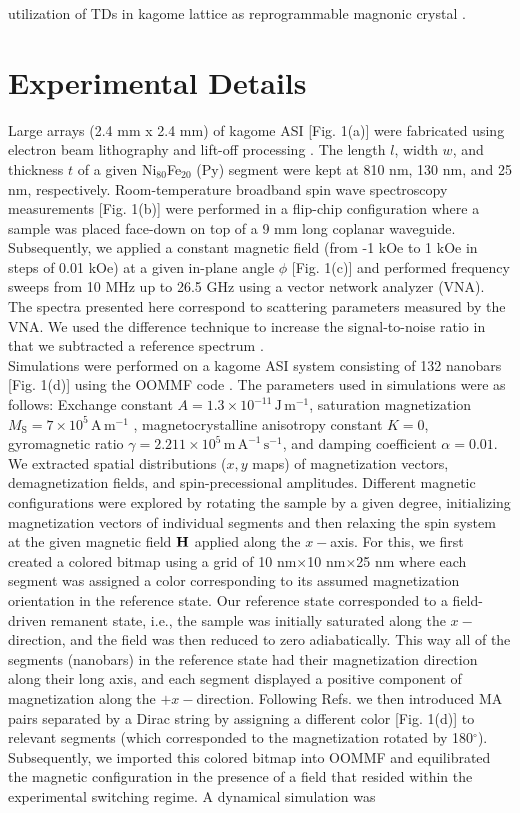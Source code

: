 \documentclass[aps,prl,preprint,showpacs,superscriptaddress,groupedaddress]{revtex4}%
\begin{document}
utilization of TDs in kagome lattice as reprogrammable magnonic crystal \cite{krawczyk2014review}.
\section{Experimental Details}
Large arrays (2.4 mm x 2.4 mm) of kagome ASI  [Fig. 1(a)] were fabricated using electron beam lithography and lift-off processing \cite{bhat2016magnetization}. The length $l$, width $w$, and thickness $t$ of a  given Ni$_{80}$Fe$_{20}$ (Py) segment  were kept at 810 nm, 130 nm, and 25 nm, respectively. Room-temperature broadband spin wave spectroscopy measurements  [Fig. 1(b)]  were performed in a flip-chip configuration where a sample was placed face-down on top of a 9 mm long coplanar waveguide. Subsequently, we applied a constant magnetic field (from -1 kOe  to 1  kOe in steps of 0.01 kOe) at a given in-plane angle $\phi$  [Fig. 1(c)]  and performed frequency sweeps from 10 MHz up to 26.5 GHz using a vector network analyzer (VNA). The  spectra presented here correspond to scattering parameters measured by the VNA. We used the difference technique to increase the signal-to-noise ratio in that we subtracted a reference spectrum \cite{bhat2016magnetization}.\\ Simulations were performed on a kagome ASI system consisting of 132 nanobars  [Fig. 1(d)] using the OOMMF code \cite{OOMMF1}. The parameters used in simulations were as follows: Exchange constant $A = 1.3 \times 10^{-11} \,\mathrm{J\,m^{-1}}$, saturation magnetization $M_{\mathrm{S}}= 7\times 10^{5} \,\mathrm{A\,m^{-1}}$ \cite{wang2007geometrical}, magnetocrystalline anisotropy constant $K = 0$, gyromagnetic ratio $\gamma = 2.211 \times 10^{5} \,\mathrm{m\,A^{-1}\,s^{-1}}$, and damping coefficient $\alpha = 0.01$.  We extracted spatial distributions ($x,y$ maps) of magnetization vectors, demagnetization fields, and spin-precessional amplitudes. Different magnetic configurations were explored by rotating the sample by a given degree, initializing magnetization vectors of individual segments \cite{gliga2013spectral} and then relaxing the spin system at the given magnetic field $\bf{H}$ applied along the $x-$axis. For this, we first created a colored bitmap using a grid of 10 nm$\times$10 nm$\times$25 nm where each segment was assigned a color corresponding to its assumed magnetization orientation in the reference state.  Our reference state corresponded to a field-driven remanent state, i.e., the sample was initially saturated along the $x-$direction, and the field was then reduced to zero adiabatically. This way all of the segments (nanobars) in the reference state had their magnetization direction along their long axis, and each segment displayed a positive component of magnetization along the $+x-$direction. Following Refs. \cite{gliga2013spectral,bhat2016magnetization} we then introduced MA pairs separated by a Dirac string by assigning a different color  [Fig. 1(d)] to relevant segments (which corresponded to the magnetization rotated by 180$^{\circ}$). Subsequently, we imported this colored bitmap into OOMMF and equilibrated the magnetic configuration in the presence of a field that resided within the experimental switching regime. A dynamical simulation was 
\end{document}
